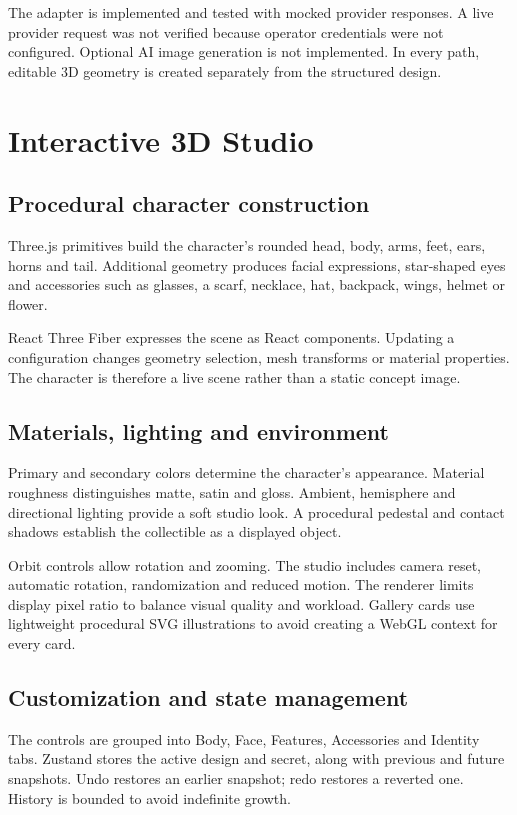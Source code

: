 \documentclass[11pt,a4paper]{article}
\begin{document}
The adapter is implemented and tested with mocked provider responses. A live provider request was not verified because operator credentials were not configured. Optional AI image generation is not implemented. In every path, editable 3D geometry is created separately from the structured design.

\section{Interactive 3D Studio}

\subsection{Procedural character construction}
Three.js primitives build the character's rounded head, body, arms, feet, ears, horns and tail. Additional geometry produces facial expressions, star-shaped eyes and accessories such as glasses, a scarf, necklace, hat, backpack, wings, helmet or flower.

React Three Fiber expresses the scene as React components. Updating a configuration changes geometry selection, mesh transforms or material properties. The character is therefore a live scene rather than a static concept image.

\subsection{Materials, lighting and environment}
Primary and secondary colors determine the character's appearance. Material roughness distinguishes matte, satin and gloss. Ambient, hemisphere and directional lighting provide a soft studio look. A procedural pedestal and contact shadows establish the collectible as a displayed object.

Orbit controls allow rotation and zooming. The studio includes camera reset, automatic rotation, randomization and reduced motion. The renderer limits display pixel ratio to balance visual quality and workload. Gallery cards use lightweight procedural SVG illustrations to avoid creating a WebGL context for every card.

\subsection{Customization and state management}
The controls are grouped into Body, Face, Features, Accessories and Identity tabs. Zustand stores the active design and secret, along with previous and future snapshots. Undo restores an earlier snapshot; redo restores a reverted one. History is bounded to avoid indefinite growth.
\end{document}

